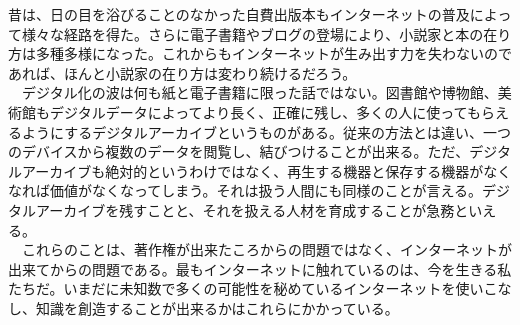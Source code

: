 \documentclass[uplatex,twocolumn,dvipdfmx]{jsarticle}
\begin{document}
昔は、日の目を浴びることのなかった自費出版本もインターネットの普及によって様々な経路を得た。さらに電子書籍やブログの登場により、小説家と本の在り方は多種多様になった。これからもインターネットが生み出す力を失わないのであれば、ほんと小説家の在り方は変わり続けるだろう。
\\　デジタル化の波は何も紙と電子書籍に限った話ではない。図書館や博物館、美術館もデジタルデータによってより長く、正確に残し、多くの人に使ってもらえるようにするデジタルアーカイブというものがある。従来の方法とは違い、一つのデバイスから複数のデータを閲覧し、結びつけることが出来る。ただ、デジタルアーカイブも絶対的というわけではなく、再生する機器と保存する機器がなくなれば価値がなくなってしまう。それは扱う人間にも同様のことが言える。デジタルアーカイブを残すことと、それを扱える人材を育成することが急務といえる。
\\　これらのことは、著作権が出来たころからの問題ではなく、インターネットが出来てからの問題である。最もインターネットに触れているのは、今を生きる私たちだ。いまだに未知数で多くの可能性を秘めているインターネットを使いこなし、知識を創造することが出来るかはこれらにかかっている。
\end{document}
